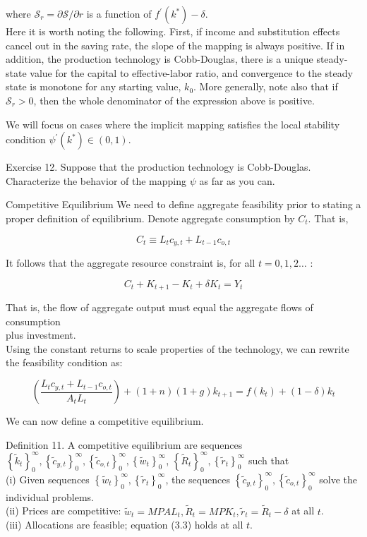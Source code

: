 \documentclass[10pt]{article}
\begin{document}
where $\mathcal{S}_{r}=\partial \mathcal{S} / \partial r$ is a function of $f^{\prime}\left(k^{*}\right)-\delta$.\\
Here it is worth noting the following. First, if income and substitution effects cancel out in the saving rate, the slope of the mapping is always positive. If in addition, the production technology is Cobb-Douglas, there is a unique steady-state value for the capital to effective-labor ratio, and convergence to the steady state is monotone for any starting value, $k_{0}$. More generally, note also that if $\mathcal{S}_{r}>0$, then the whole denominator of the expression above is positive.

We will focus on cases where the implicit mapping satisfies the local stability condition $\psi^{\prime}\left(k^{*}\right) \in(0,1)$.

Exercise 12. Suppose that the production technology is Cobb-Douglas. Characterize the behavior of the mapping $\psi$ as far as you can.

Competitive Equilibrium We need to define aggregate feasibility prior to stating a proper definition of equilibrium. Denote aggregate consumption by $C_{t}$. That is,

$$
C_{t} \equiv L_{t} c_{y, t}+L_{t-1} c_{o, t}
$$

It follows that the aggregate resource constraint is, for all $t=0,1,2 \ldots$ :

$$
C_{t}+K_{t+1}-K_{t}+\delta K_{t}=Y_{t}
$$

That is, the flow of aggregate output must equal the aggregate flows of consumption\\
plus investment.\\
Using the constant returns to scale properties of the technology, we can rewrite the feasibility condition as:


\begin{equation*}
\left(\frac{L_{t} c_{y, t}+L_{t-1} c_{o, t}}{A_{t} L_{t}}\right)+(1+n)(1+g) k_{t+1}=f\left(k_{t}\right)+(1-\delta) k_{t} \tag{3.3}
\end{equation*}


We can now define a competitive equilibrium.

Definition 11. A competitive equilibrium are sequences $\left\{\tilde{k}_{t}\right\}_{0}^{\infty},\left\{\tilde{c}_{y, t}\right\}_{0}^{\infty},\left\{\tilde{c}_{o, t}\right\}_{0}^{\infty},\left\{\tilde{w}_{t}\right\}_{0}^{\infty}$, $\left\{\tilde{R}_{t}\right\}_{0}^{\infty},\left\{\tilde{r}_{t}\right\}_{0}^{\infty}$ such that\\
(i) Given sequences $\left\{\tilde{w}_{t}\right\}_{0}^{\infty},\left\{\tilde{r}_{t}\right\}_{0}^{\infty}$, the sequences $\left\{\tilde{c}_{y, t}\right\}_{0}^{\infty},\left\{\tilde{c}_{o, t}\right\}_{0}^{\infty}$ solve the individual problems.\\
(ii) Prices are competitive: $\tilde{w}_{t}=M P A L_{t}, \tilde{R}_{t}=M P K_{t}, \tilde{r}_{t}=\tilde{R}_{t}-\delta$ at all $t$.\\
(iii) Allocations are feasible; equation (3.3) holds at all $t$.
\end{document}
